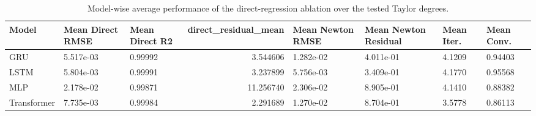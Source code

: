 \begin{table}
\caption{Model-wise average performance of the direct-regression ablation over the tested Taylor degrees.}
\label{tab:direct_regression_model_average}
\begin{tabular}{lllrllll}
\toprule
Model & Mean Direct RMSE & Mean Direct R2 & direct_residual_mean & Mean Newton RMSE & Mean Newton Residual & Mean Iter. & Mean Conv. \\
\midrule
GRU & 5.517e-03 & 0.99992 & 3.544606 & 1.282e-02 & 4.011e-01 & 4.1209 & 0.94403 \\
LSTM & 5.804e-03 & 0.99991 & 3.237899 & 5.756e-03 & 3.409e-01 & 4.1770 & 0.95568 \\
MLP & 2.178e-02 & 0.99871 & 11.256740 & 2.306e-02 & 8.905e-01 & 4.1410 & 0.88382 \\
Transformer & 7.735e-03 & 0.99984 & 2.291689 & 1.270e-02 & 8.704e-01 & 3.5778 & 0.86113 \\
\bottomrule
\end{tabular}
\end{table}
